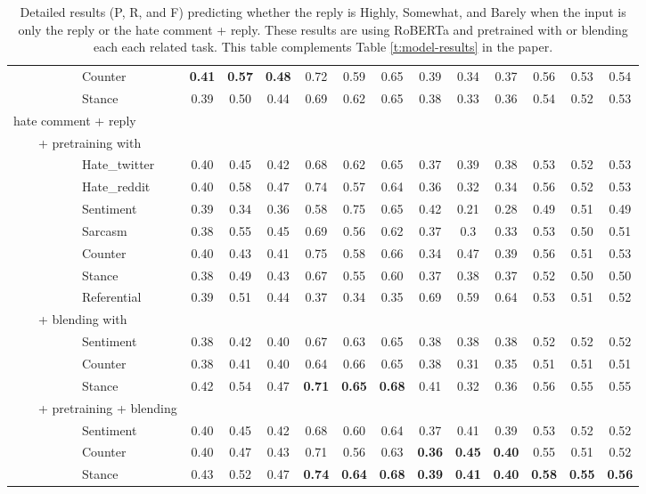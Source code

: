 \documentclass[11pt]{article}
\begin{document}
\begin{table*}
\begin{tabular}{l ccc ccc ccc ccc}
		~~~~~~~~~~~Counter &\textbf{0.41} &	\textbf{0.57} & \textbf{0.48 }&	0.72 &	0.59 &	0.65 & 0.39 &	0.34 &	0.37 &	0.56 &	0.53 &	0.54\\
		~~~~~~~~~~~Stance & 0.39 &	0.50 & 	0.44 &	0.69 &	0.62 &	0.65 &	0.38 &	0.33 &	0.36  &	0.54 &	0.52 &	0.53\\
		hate comment + reply\\
		~~~~+ pretraining with \\
		~~~~~~~~~~~Hate\_twitter & 0.40 & 0.45 & 0.42 &	0.68 &	0.62 & 0.65 & 0.37 &	0.39 &	0.38  & 0.53 & 0.52 &	0.53\\
		~~~~~~~~~~~Hate\_reddit & 0.40 & 0.58 & 0.47 &	0.74 &	0.57 &	0.64 &	0.36 &	0.32 &	0.34  &	0.56 &	0.52 &	0.53\\
		~~~~~~~~~~~Sentiment & 0.39 &  0.34 & 0.36 & 	0.58 & 	0.75 & 	0.65 &  0.42 &  0.21 &  0.28 & 	0.49 & 	0.51 & 	0.49\\
		~~~~~~~~~~~Sarcasm & 0.38 & 0.55 &	0.45 & 0.69 & 0.56 & 	0.62 & 	0.37 & 	0.3 & 0.33 & 	0.53 & 	0.50  & 0.51\\
		~~~~~~~~~~~Counter & 0.40 & 0.43 &  0.41 & 	0.75 & 	0.58 & 	0.66 &	0.34 & 	0.47 & 	0.39  & 	0.56 & 	0.51 & 	0.53\\
		~~~~~~~~~~~Stance & 0.38 &	0.49 &	0.43 &	0.67 &	0.55 &	0.60 &	0.37 &	0.38 &	0.37  &	0.52 &	0.50 &	0.50\\
		~~~~~~~~~~~Referential & 0.39 & 0.51 & 0.44 & 0.37 & 0.34 & 0.35 & 0.69 & 0.59 & 0.64 & 0.53 & 0.51 & 0.52\\
		~~~~+ blending with \\
		~~~~~~~~~~~Sentiment & 0.38 &	0.42 &	0.40 &	0.67 &	0.63 &	0.65 &	0.38 &	0.38 &	0.38 &	0.52 &	0.52 &	0.52\\
		~~~~~~~~~~~Counter &0.38 &	0.41 &	0.40 &	0.64 &	0.66 &	0.65 &	0.38 &	 0.31 &	0.35 &	0.51 &	0.51 &	0.51\\
		~~~~~~~~~~~Stance & 0.42 &	0.54 &	0.47 &	\textbf{0.71} &	\textbf{0.65} &	\textbf{0.68} &	0.41 &	0.32 &	0.36  &	0.56 &	0.55 &	0.55 \\
		~~~~+ pretraining + blending\\
		~~~~~~~~~~~Sentiment & 0.40 &	0.45 &	0.42 &	0.68 &	0.60 &	0.64 &	0.37 &	0.41 &	0.39 &	0.53 &	0.52 &	0.52\\
		~~~~~~~~~~~Counter & 0.40 & 0.47 &	0.43 &	0.71 &	0.56 &	0.63 & \textbf{0.36} &	\textbf{0.45} &	\textbf{0.40}  &	0.55 &	0.51 & 0.52\\
		~~~~~~~~~~~Stance & 0.43 &	0.52 &	0.47&	\textbf{0.74} &	\textbf{0.64} &	\textbf{0.68}  &	\textbf{0.39} &	\textbf{0.41} & \textbf{	0.40} &	\textbf{0.58} &	\textbf{0.55} &	\textbf{0.56} \\
		\bottomrule
		
	\end{tabular}
	\caption{Detailed results (P, R, and F) predicting whether the reply is Highly, Somewhat, and Barely when the input is only the reply or the hate comment + reply. These results are using RoBERTa and pretrained with or blending each each related task. This table complements Table \ref{t:model-results} in the paper.}
	\label{t:detailed-results}
\end{table*}
\end{document}
